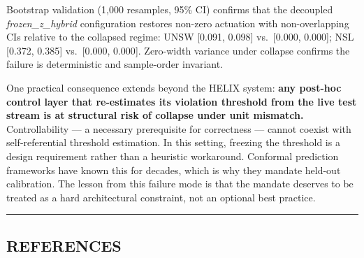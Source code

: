 \documentclass[
  conference]{IEEEtran}
\begin{document}
Bootstrap validation (1,000 resamples, 95\% CI) confirms that the
decoupled \emph{frozen\_z\_hybrid} configuration restores non-zero
actuation with non-overlapping CIs relative to the collapsed regime:
UNSW {[}0.091, 0.098{]} vs.~{[}0.000, 0.000{]}; NSL {[}0.372, 0.385{]}
vs.~{[}0.000, 0.000{]}. Zero-width variance under collapse confirms the
failure is deterministic and sample-order invariant.

One practical consequence extends beyond the HELIX system: \textbf{any
post-hoc control layer that re-estimates its violation threshold from
the live test stream is at structural risk of collapse under unit
mismatch.} Controllability --- a necessary prerequisite for correctness
--- cannot coexist with self-referential threshold estimation. In this
setting, freezing the threshold is a design requirement rather than a
heuristic workaround. Conformal prediction frameworks have known this
for decades, which is why they mandate held-out calibration. The lesson
from this failure mode is that the mandate deserves to be treated as a
hard architectural constraint, not an optional best practice.

\begin{center}\rule{0.5\linewidth}{0.5pt}\end{center}

\subsection{REFERENCES}\label{references}
\end{document}
